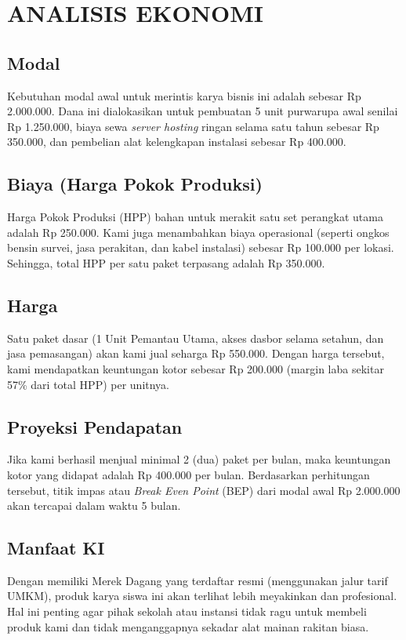 \documentclass[12pt, a4paper]{article}
\begin{document}
\section{ANALISIS EKONOMI}

\subsection{Modal}
Kebutuhan modal awal untuk merintis karya bisnis ini adalah sebesar Rp 2.000.000. Dana ini dialokasikan untuk pembuatan 5 unit purwarupa awal senilai Rp 1.250.000, biaya sewa \textit{server hosting} ringan selama satu tahun sebesar Rp 350.000, dan pembelian alat kelengkapan instalasi sebesar Rp 400.000.

\subsection{Biaya (Harga Pokok Produksi)}
Harga Pokok Produksi (HPP) bahan untuk merakit satu set perangkat utama adalah Rp 250.000. Kami juga menambahkan biaya operasional (seperti ongkos bensin survei, jasa perakitan, dan kabel instalasi) sebesar Rp 100.000 per lokasi. Sehingga, total HPP per satu paket terpasang adalah Rp 350.000.

\subsection{Harga}
Satu paket dasar (1 Unit Pemantau Utama, akses dasbor selama setahun, dan jasa pemasangan) akan kami jual seharga Rp 550.000. Dengan harga tersebut, kami mendapatkan keuntungan kotor sebesar Rp 200.000 (margin laba sekitar 57\% dari total HPP) per unitnya.

\subsection{Proyeksi Pendapatan}
Jika kami berhasil menjual minimal 2 (dua) paket per bulan, maka keuntungan kotor yang didapat adalah Rp 400.000 per bulan. Berdasarkan perhitungan tersebut, titik impas atau \textit{Break Even Point} (BEP) dari modal awal Rp 2.000.000 akan tercapai dalam waktu 5 bulan.

\subsection{Manfaat KI}
Dengan memiliki Merek Dagang yang terdaftar resmi (menggunakan jalur tarif UMKM), produk karya siswa ini akan terlihat lebih meyakinkan dan profesional. Hal ini penting agar pihak sekolah atau instansi tidak ragu untuk membeli produk kami dan tidak menganggapnya sekadar alat mainan rakitan biasa.
\end{document}
